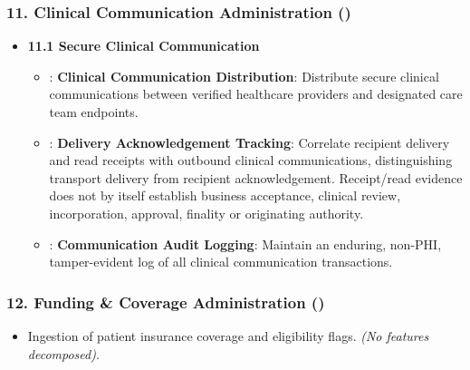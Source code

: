 \subsubsection*{11. Clinical Communication Administration (\texttt{})}
\label{rad:enabling:338}

\begin{itemize}

\item
\textbf{11.1 Secure Clinical Communication}


\begin{itemize}

\item
\texttt{}: \textbf{Clinical Communication Distribution}: Distribute secure clinical communications between verified healthcare providers and designated care team endpoints.



\item
\texttt{}: \textbf{Delivery Acknowledgement Tracking}: Correlate recipient delivery and read receipts with outbound clinical communications, distinguishing transport delivery from recipient acknowledgement. Receipt/\allowbreak{}read evidence does not by itself establish business acceptance, clinical review, incorporation, approval, finality or originating authority.



\item
\texttt{}: \textbf{Communication Audit Logging}: Maintain an enduring, non-PHI, tamper-evident log of all clinical communication transactions.



\end{itemize}


\end{itemize}
\label{rad:enabling:343}
\subsubsection*{12. Funding \& Coverage Administration (\texttt{})}
\label{rad:enabling:344}

\begin{itemize}

\item
Ingestion of patient insurance coverage and eligibility flags. \emph{(No features decomposed)}.



\end{itemize}
\label{rad:enabling:346}
